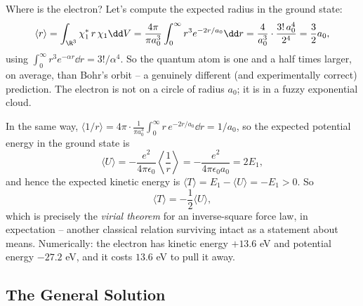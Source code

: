 \begin{example}
    Where is the electron? Let's compute the expected radius in the ground state:
    $$
    \langle r \rangle = \int_{\R^3} \chi_1^* \, r \, \chi_1 \dd V = \frac{4 \pi}{\pi a_0^3} \int_0^\infty r^3 e^{-2r/a_0} \dd r = \frac{4}{a_0^3} \cdot \frac{3! \, a_0^4}{2^4} = \frac{3}{2} a_0,
    $$
    using $\int_0^\infty r^3 e^{-\alpha r} \dd r = 3!/\alpha^4$. So the quantum atom is one and a half times larger, on average, than Bohr's orbit -- a genuinely different (and experimentally correct) prediction. The electron is not on a circle of radius $a_0$; it is in a fuzzy exponential cloud.
\end{example}

\begin{example}
    In the same way, $\langle 1/r \rangle = 4 \pi \cdot \frac{1}{\pi a_0^3}\int_0^\infty r \, e^{-2r/a_0} \dd r = 1/a_0$, so the expected potential energy in the ground state is
    $$
    \langle U \rangle = -\frac{e^2}{4 \pi \epsilon_0} \left\langle \frac{1}{r} \right\rangle = -\frac{e^2}{4 \pi \epsilon_0 a_0} = 2 E_1,
    $$
    and hence the expected kinetic energy is $\langle T \rangle = E_1 - \langle U \rangle = -E_1 > 0$. So
    $$
    \langle T \rangle = -\frac{1}{2}\langle U \rangle,
    $$
    which is precisely the \emph{virial theorem} for an inverse-square force law, in expectation -- another classical relation surviving intact as a statement about means. Numerically: the electron has kinetic energy $+13.6$ eV and potential energy $-27.2$ eV, and it costs $13.6$ eV to pull it away.
\end{example}

\subsection{The General Solution}

